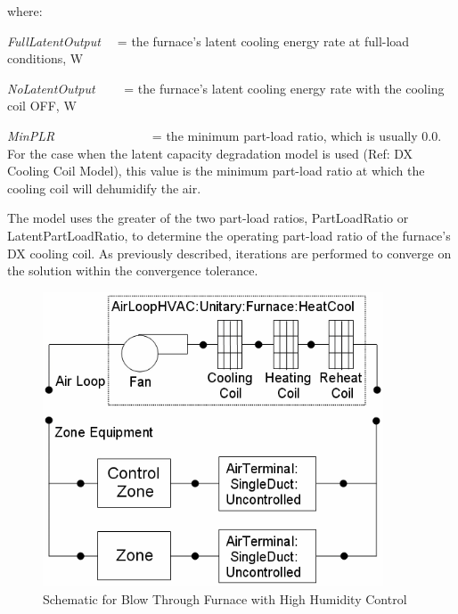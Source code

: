 where:

\emph{FullLatentOutput~~} = the furnace's latent cooling energy rate at full-load conditions, W

\emph{NoLatentOutput}~~~~ = the furnace's latent cooling energy rate with the cooling coil OFF, W

\emph{MinPLR}~~~~~~~~~~~~~~~ = the minimum part-load ratio, which is usually 0.0. For the case when the latent capacity degradation model is used (Ref: DX Cooling Coil Model), this value is the minimum part-load ratio at which the cooling coil will dehumidify the air.

The model uses the greater of the two part-load ratios, PartLoadRatio or LatentPartLoadRatio, to determine the operating part-load ratio of the furnace's DX cooling coil. As previously described, iterations are performed to converge on the solution within the convergence tolerance.

\begin{figure}[hbtp] %
\centering
\includegraphics[width=0.9\textwidth, height=0.9\textheight, keepaspectratio=true]{media/image5049.png}
\caption{Schematic for Blow Through Furnace with High Humidity Control \protect \label{fig:schematic-for-blow-through-furnace-with-high}}
\end{figure}

